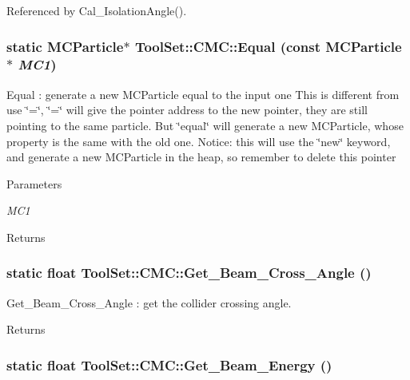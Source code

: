 Referenced by Cal\_\-IsolationAngle().\hypertarget{classToolSet_1_1CMC_a29838e430204b6f0d6e5cdf8a669f615}{
\subsubsection[{Equal}]{\setlength{\rightskip}{0pt plus 5cm}static MCParticle$\ast$ ToolSet::CMC::Equal (const MCParticle $\ast$ {\em MC1})}}
\label{classToolSet_1_1CMC_a29838e430204b6f0d6e5cdf8a669f615}


Equal : generate a new MCParticle equal to the input one This is different from use \char`\"{}=\char`\"{}, \char`\"{}=\char`\"{} will give the pointer address to the new pointer, they are still pointing to the same particle. But \char`\"{}equal\char`\"{} will generate a new MCParticle, whose property is the same with the old one. Notice: this will use the \char`\"{}new\char`\"{} keyword, and generate a new MCParticle in the heap, so remember to delete this pointer


\begin{DoxyParams}{Parameters}
\item[{\em MC1}]\end{DoxyParams}
\begin{DoxyReturn}{Returns}

\end{DoxyReturn}
\hypertarget{classToolSet_1_1CMC_aab8dca236c78fffe1b63bac50583090a}{
\subsubsection[{Get\_\-Beam\_\-Cross\_\-Angle}]{\setlength{\rightskip}{0pt plus 5cm}static float ToolSet::CMC::Get\_\-Beam\_\-Cross\_\-Angle ()}}
\label{classToolSet_1_1CMC_aab8dca236c78fffe1b63bac50583090a}


Get\_\-Beam\_\-Cross\_\-Angle : get the collider crossing angle. \begin{DoxyReturn}{Returns}

\end{DoxyReturn}
\hypertarget{classToolSet_1_1CMC_afaf6f983eee33318bcaf7923cde7266e}{
\subsubsection[{Get\_\-Beam\_\-Energy}]{\setlength{\rightskip}{0pt plus 5cm}static float ToolSet::CMC::Get\_\-Beam\_\-Energy ()}}
\label{classToolSet_1_1CMC_afaf6f983eee33318bcaf7923cde7266e}


